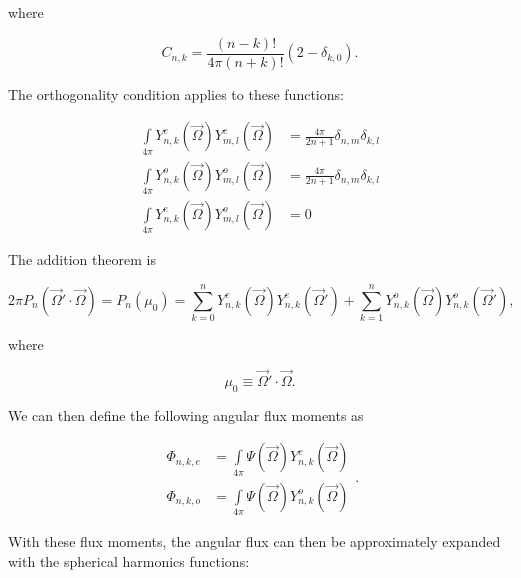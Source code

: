 \noindent where

\begin{equation}
\label{eq::App_SN_sharm_consts}
C_{n,k} = \frac{(n-k)!}{4 \pi (n+k) !}( 2-  \delta_{k,0}).
\end{equation}

\noindent The orthogonality condition applies to these functions:

\begin{equation}
\label{eq::App_SN_sharm_orth}
\begin{aligned}
\int\limits_{4 \pi} Y^e_{n,k} (\vec{\Omega}) Y^e_{m,l} (\vec{\Omega}) &= \frac{4 \pi}{2n+1} \delta_{n,m} \delta_{k,l} \\ 
\int\limits_{4 \pi} Y^o_{n,k} (\vec{\Omega}) Y^o_{m,l} (\vec{\Omega}) &= \frac{4 \pi}{2n+1} \delta_{n,m} \delta_{k,l} \\ 
\int\limits_{4 \pi} Y^e_{n,k} (\vec{\Omega}) Y^o_{m,l} (\vec{\Omega}) &= 0
\end{aligned} 
\end{equation}

\noindent The addition theorem is

\begin{equation}
\label{eq::App_SN_sharm_addition}
2 \pi P_n (\vec{\Omega}' \cdot \vec{\Omega}) = P_n (\mu_0) = \sum_{k=0}^{n} Y^e_{n,k} (\vec{\Omega}) Y^e_{n,k} (\vec{\Omega}') + \sum_{k=1}^{n} Y^o_{n,k} (\vec{\Omega}) Y^o_{n,k} (\vec{\Omega}') ,
\end{equation}

\noindent where

\begin{equation}
\label{eq::App_SN_mu_to_omegas}
\mu_0 \equiv \vec{\Omega}' \cdot \vec{\Omega} .
\end{equation}

\noindent We can then define the following angular flux moments as

\begin{equation}
\label{eq::App_SN_sharm_fluxmom}
\begin{aligned}
\Phi_{n,k,e} &=\int\limits_{4 \pi}\Psi (\vec{\Omega})  Y^e_{n,k} (\vec{\Omega})   \\ 
\Phi_{n,k,o} &=\int\limits_{4 \pi}\Psi (\vec{\Omega}) Y^o_{n,k} (\vec{\Omega}) 
\end{aligned} .
\end{equation}

\noindent With these flux moments, the angular flux can then be approximately expanded with the spherical harmonics functions:

